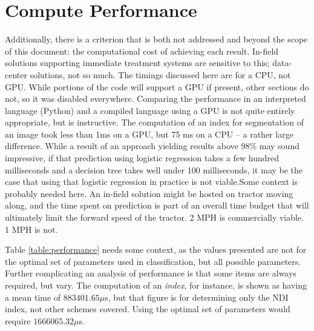 \documentclass[letterpaper]{report}
\begin{document}
\section{Compute Performance}
\label{section:performance}
Additionally, there is a criterion that is both not addressed and beyond the scope of this document: the computational cost of achieving each result. In-field solutions supporting immediate treatment systems are sensitive to this; data-center solutions, not so much. The timings discussed here are for a CPU, not GPU. While portions of the code will support a GPU if present, other sections do not, so it was disabled everywhere. Comparing the performance in an interpreted language (Python) and a compiled language using a GPU is not quite entirely appropriate, but is instructive. The computation of an index for segmentation of an image took less than 1ms on a GPU, but 75 ms on a CPU -- a rather large difference. While a result of an approach yielding results above 98\% may sound impressive, if that prediction using logistic regression takes a few hundred milliseconds and a decision tree takes well under 100 milliseconds, it may be the case that using that logistic regression in practice is not viable.Some context is probably needed here. An in-field solution might be hosted on  tractor moving along, and the time spent on prediction is part of an overall time budget that will ultimately limit the forward speed of the tractor. 2 MPH is commercially viable. 1 MPH is not.

{
\renewcommand{\arraystretch}{0.9}

}

Table \ref{table:performance} needs some context, as the values presented are not for the optimal set of parameters used in classification, but all possible parameters. Further complicating an analysis of performance is that some items are always required, but vary. The computation of an \textit{index}, for instance, is shown as having a mean time of $883401.65 \mu$s, but that figure is for determining only the NDI index, not other schemes covered. Using the optimal set of parameters would require $1666065.32 \mu$s. 
\end{document}

